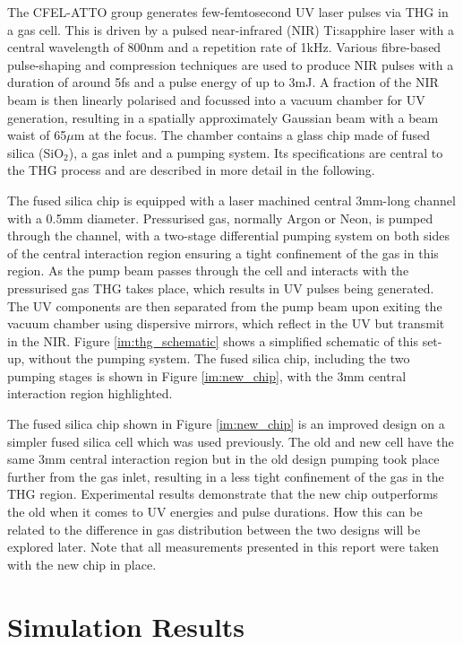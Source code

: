 \documentclass[a4paper]{jpconf}
\begin{document}
The CFEL-ATTO group generates few-femtosecond UV laser pulses via THG in a gas cell. This is driven by a pulsed near-infrared (NIR) Ti:sapphire laser with a central wavelength of 800nm and a repetition rate of 1kHz. Various fibre-based pulse-shaping and compression techniques are used to produce NIR pulses with a duration of around 5fs and a pulse energy of up to 3mJ. A fraction of the NIR beam is then linearly polarised and focussed into a vacuum chamber for UV generation, resulting in a spatially approximately Gaussian beam with a beam waist of 65$\mu$m at the focus. The chamber contains a glass chip made of fused silica (SiO$_2$), a gas inlet and a pumping system. Its specifications are central to the THG process and are described in more detail in the following. \par 
The fused silica chip is equipped with a laser machined central 3mm-long channel with a 0.5mm diameter. Pressurised gas, normally Argon or Neon, is pumped through the channel, with a two-stage differential pumping system on both sides of the central interaction region ensuring a tight confinement of the gas in this region. As the pump beam passes through the cell and interacts with the pressurised gas THG takes place, which results in UV pulses being generated. The UV components are then separated from the pump beam upon exiting the vacuum chamber using dispersive mirrors, which reflect in the UV but transmit in the NIR. Figure \ref{im:thg_schematic} shows a simplified schematic of this set-up, without the pumping system. The fused silica chip, including the two pumping stages is shown in Figure \ref{im:new_chip}, with the 3mm central interaction region highlighted. \par 
The fused silica chip shown in Figure \ref{im:new_chip} is an improved design on a simpler fused silica cell which was used previously. The old and new cell have the same 3mm central interaction region but in the old design pumping took place further from the gas inlet, resulting in a less tight confinement of the gas in the THG region. Experimental results demonstrate that the new chip outperforms the old when it comes to UV energies and pulse durations. How this can be related to the difference in gas distribution between the two designs will be explored later. Note that all measurements presented in this report were taken with the new chip in place. 

\section{Simulation Results}
\end{document}
